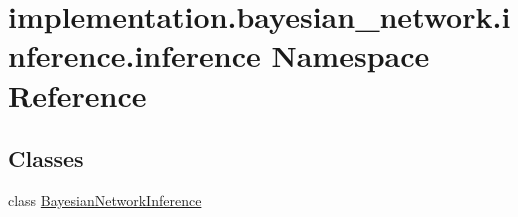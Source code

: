 \hypertarget{namespaceimplementation_1_1bayesian__network_1_1inference_1_1inference}{}\section{implementation.\+bayesian\+\_\+network.\+inference.\+inference Namespace Reference}
\label{namespaceimplementation_1_1bayesian__network_1_1inference_1_1inference}
\subsection*{Classes}
\begin{DoxyCompactItemize}
\item 
class \hyperlink{classimplementation_1_1bayesian__network_1_1inference_1_1inference_1_1_bayesian_network_inference}{Bayesian\+Network\+Inference}
\end{DoxyCompactItemize}
